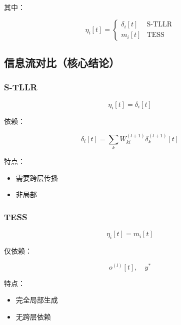 \documentclass[journal,12pt,onecolumn]{IEEEtran}
\begin{document}
其中：

\begin{equation}
\eta_i[t] =
\begin{cases}
\delta_i[t] & \text{S-TLLR} \\
m_i[t] & \text{TESS}
\end{cases}
\end{equation}



\subsection{信息流对比（核心结论）}

\subsubsection{S-TLLR}

\begin{equation}
\eta_i[t] = \delta_i[t]
\end{equation}

依赖：

\begin{equation}
\delta_i[t] =
\sum_k W_{ki}^{(l+1)} \delta_k^{(l+1)}[t]
\end{equation}

特点：

\begin{itemize}
\item 需要跨层传播
\item 非局部
\end{itemize}



\subsubsection{TESS}

\begin{equation}
\eta_i[t] = m_i[t]
\end{equation}

仅依赖：

\begin{equation}
o^{(l)}[t], \quad y^*
\end{equation}

特点：

\begin{itemize}
\item 完全局部生成
\item 无跨层依赖
\end{itemize}
\end{document}
